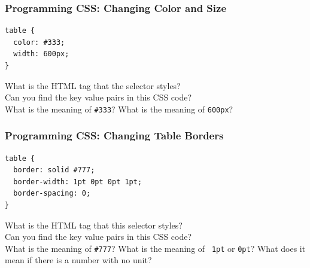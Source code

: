 \documentclass[14pt,aspectratio=169]{beamer}
\begin{document}
%
\begin{frame}[fragile]
  \frametitle{Programming CSS: Changing Color and Size}
  \normalsize
  \hspace*{.25in}
  \begin{minipage}{6in}
    \vspace*{.2in}
    \begin{verbatim}
table {
  color: #333;
  width: 600px;
}
    \end{verbatim}
  \end{minipage}
  \vspace*{.05in}
  \begin{center}
    \noindent What is the HTML tag that the selector styles?\\
    \noindent Can you find the key value pairs in this CSS code?\\
    \noindent What is the meaning of {\tt \#333}? What is the meaning of {\tt 600px}?\\
  \end{center}
\end{frame}

%
\begin{frame}[fragile]
  \frametitle{Programming CSS: Changing Table Borders}
  \normalsize
  \hspace*{.25in}
  \begin{minipage}{6in}
    \vspace*{.2in}
    \begin{verbatim}
table {
  border: solid #777;
  border-width: 1pt 0pt 0pt 1pt;
  border-spacing: 0;
}
    \end{verbatim}
  \end{minipage}
  \vspace*{.05in}
  \begin{center}
    \noindent What is the HTML tag that this selector styles?\\
    \noindent Can you find the key value pairs in this CSS code?\\
    \noindent What is the meaning of {\tt \#777}? What is the meaning of {\tt
    1pt} or {\tt 0pt}? What does it mean if there is a number with no unit?\\
  \end{center}
\end{frame}
\end{document}
